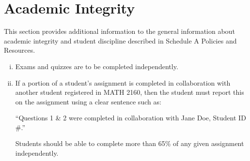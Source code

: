 \documentclass[12pt]{article}
\begin{document}
\section{Academic Integrity}

This section provides additional information to the general information about academic integrity and student discipline described in Schedule A Policies and Resources.

\begin{enumerate}[(i)]
\item Exams and quizzes are to be completed independently.

\item If a portion of a student's assignment is completed in collaboration with another student registered in MATH 2160, then the student must report this on the assignment using a clear sentence such as:

``Questions 1 \& 2 were completed in collaboration with Jane Doe, Student ID \#.''

Students should be able to complete more than 65\% of any given assignment independently.
\end{enumerate}
\end{document}
